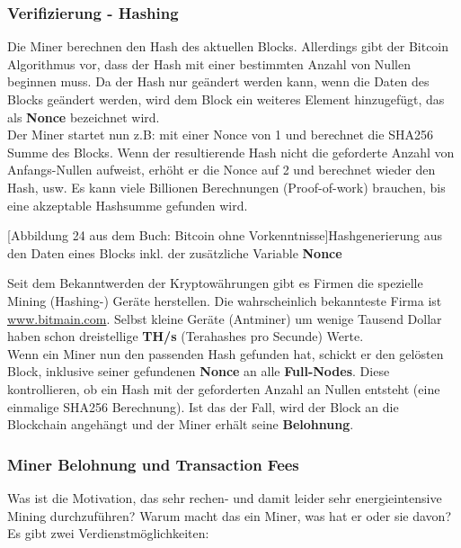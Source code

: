 \documentclass[10pt,a4paper,titlepage]{paper}
\begin{document}
\subsubsection{Verifizierung - Hashing}
Die Miner berechnen den Hash des aktuellen Blocks. Allerdings gibt der Bitcoin Algorithmus vor, dass der Hash mit einer bestimmten Anzahl von Nullen beginnen muss. Da der Hash nur geändert werden kann, wenn die Daten des Blocks geändert werden, wird dem Block ein weiteres Element hinzugefügt, das als \textbf{Nonce} bezeichnet wird.\\
Der Miner startet nun z.B: mit einer Nonce von 1 und berechnet die SHA256 Summe des Blocks. Wenn der resultierende Hash nicht die geforderte Anzahl von Anfangs-Nullen aufweist, erhöht er die Nonce auf 2 und berechnet wieder den Hash, usw. Es kann viele Billionen Berechnungen (Proof-of-work) brauchen, bis eine akzeptable Hashsumme gefunden wird.
\begin{center}
[Abbildung 24 aus dem Buch: Bitcoin ohne Vorkenntnisse]{Hashgenerierung aus den Daten eines Blocks inkl. der zusätzliche Variable \textbf{Nonce}}
\end{center}
Seit dem Bekanntwerden der Kryptowährungen gibt es Firmen die spezielle Mining (Hashing-) Geräte herstellen. Die wahrscheinlich bekannteste Firma ist \href{https://www.bitmain.com/}{\color{blue}www.bitmain.com}. Selbst kleine Geräte (Antminer) um wenige Tausend Dollar haben schon dreistellige \textbf{TH/s} (Terahashes pro Secunde) Werte.
\vspace{.3cm}\\
Wenn ein Miner nun den passenden Hash gefunden hat, schickt er den gelösten Block, inklusive seiner gefundenen \textbf{Nonce} an alle \textbf{Full-Nodes}. Diese kontrollieren, ob ein Hash mit der geforderten Anzahl an Nullen entsteht (eine einmalige SHA256 Berechnung). Ist das der Fall, wird der Block an die Blockchain angehängt und der Miner erhält seine \textbf{Belohnung}.
\subsubsection{Miner Belohnung und Transaction Fees}
Was ist die Motivation, das sehr rechen- und damit leider sehr energieintensive Mining durchzuführen? Warum macht das ein Miner, was hat er oder sie davon?\\
Es gibt zwei Verdienstmöglichkeiten:
\end{document}
